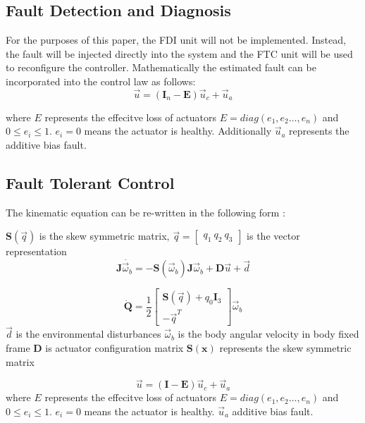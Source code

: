 \subsection{Fault Detection and Diagnosis}
For the purposes of this paper, the FDI unit will not be implemented. Instead, the fault will be injected directly into the system and the FTC unit will be used to reconfigure the controller. Mathematically the estimated fault can be incorporated into the control law as follows:
\begin{equation}\vec{u}=(\mathbf{I}_{n}-\mathbf{E})\vec{u}_{c}+\vec{u}_{a}\end{equation}

where $E$ represents the effecitve loss of actuators $E=diag(e_{1},e_{2}\dots,e_{n})$ and $0\leq e_{i}\leq 1$. $e_{i}=0$ means the actuator is healthy. Additionally $\vec{u}_{a}$ represents the additive bias fault.

\subsection{Fault Tolerant Control}
The kinematic equation can be re-written in the following form \cite{shenActiveFaulttolerantControl2019}:

$\mathbf{S}(\vec{q})$ is the skew symmetric matrix, $\vec{q}=\begin{bmatrix}q_{1} \ q_{2} \ q_{3} \end{bmatrix}$ is the vector representation
\begin{equation}\mathbf{J}\dot{\vec{\omega}_{b}}=-\mathbf{S}(\vec{\omega}_{b})\mathbf{J}\vec{\omega}_{b}+\mathbf{D}\vec{u}+\vec{d}\end{equation}

\begin{equation} \dot{\mathbf{Q}}=\frac{1}{2}\begin{bmatrix}
\mathbf{S}(\vec{q})+q_{0}\mathbf{I}_{3} \\
-\vec{q}^{T}
\end{bmatrix} \vec{\omega}_{b}\end{equation}
$\vec{d}$ is the environmental disturbances
$\vec{\omega}_{b}$ is the body angular velocity in body fixed frame
$\mathbf{D}$ is actuator configuration matrix
$\mathbf{S(x)}$ represents the skew symmetric matrix 

\begin{equation}\vec{u}=(\mathbf{I}-\mathbf{E})\vec{u}_{c}+\vec{u}_{a}\end{equation}
where $E$ represents the effecitve loss of actuators $E=diag(e_{1},e_{2}\dots,e_{n})$ and $0\leq e_{i}\leq 1$. $e_{i}=0$ means the actuator is healthy. $\vec{u}_{a}$ additive bias fault.


